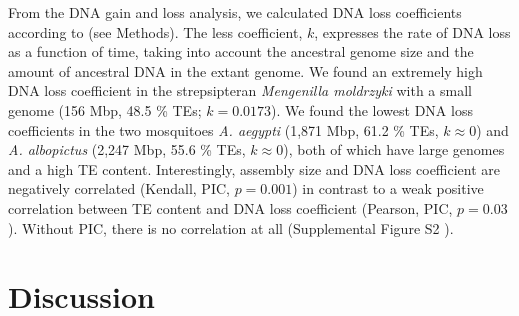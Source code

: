 From the DNA gain and loss analysis, we calculated DNA loss coefficients
according to \citep{Kapusta2017a} (see Methods). The less coefficient,
$k$, expresses the rate of DNA loss as a function of
time, taking into account the ancestral genome size and the amount of
ancestral DNA in the extant genome. We found an extremely high DNA loss
coefficient in the strepsipteran \emph{Mengenilla moldrzyki} with a
small genome (156 Mbp, 48.5 \% TEs; $k = 0.0173$). We found the
lowest DNA loss coefficients in the two mosquitoes \emph{A. aegypti}
(1,871 Mbp, 61.2 \% TEs, $k \approx 0$) and \emph{A. albopictus}
(2,247 Mbp, 55.6 \% TEs, $k \approx 0$), both of which have large
genomes and a high TE content. Interestingly, assembly size and DNA loss
coefficient are negatively correlated (Kendall, PIC, $p = 0.001$)
in contrast to a weak positive correlation between TE content and DNA
loss coefficient (Pearson, PIC, $p = 0.03$). Without PIC, there
is no correlation at all (Supplemental Figure S2 ).



\section{Discussion}\label{discussion}

